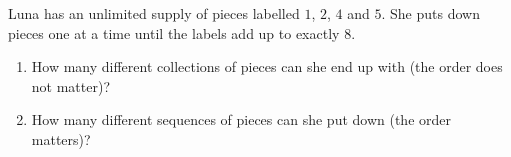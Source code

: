 Luna has an unlimited supply of pieces labelled $1$, $2$, $4$ and $5$. She puts down pieces one at a time until the labels add up to exactly $8$.
\begin{enumerate}
\item[(a)] How many different collections of pieces can she end up with (the order does not matter)?
\item[(b)] How many different sequences of pieces can she put down (the order matters)?
\end{enumerate}
